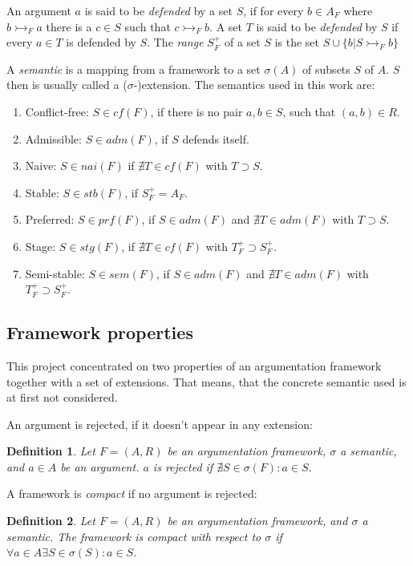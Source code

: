 \documentclass[parskip=half]{scrartcl}
\newtheorem{definition}{Definition}
\begin{document}
An argument $a$ is said to be \emph{defended} by a set $S$, if for every $b \in
A_F$ where $b \rightarrowtail_F a$ there is a $c \in S$ such that $c
\rightarrowtail_F b$. A set $T$ is said to be \emph{defended} by $S$ if every
$a \in T$ is defended by $S$. The \emph{range} $S_F^{+}$ of a set $S$ is the
set $S \cup\{b | S \rightarrowtail_F b\}$

A \emph{semantic} is a mapping from a framework to a set $\sigma(A)$ of subsets
$S$ of $A$.  $S$ then is usually called a ($\sigma$-)extension. The semantics
used in this work are:
\begin{enumerate}
  \item Conflict-free: $S \in cf(F)$, if there is no pair $a,b \in S$, such that
      $(a,b) \in R$.
  \item Admissible: $S \in adm(F)$, if $S$ defends itself.
  \item Naive: $S \in nai(F)$ if $\nexists T\in cf(F)$ with $T \supset S$.
  \item Stable: $S \in stb(F)$, if $S_F^{+} = A_F$.
  \item Preferred: $S \in prf(F)$, if $S \in adm(F)$ and $\nexists T\in adm(F)$
      with $T \supset S$.
  \item Stage: $S \in stg(F)$, if $\nexists T\in cf(F)$ with $T_F^{+} \supset
      S_F^{+}$.
  \item Semi-stable: $S \in sem(F)$, if $S \in adm(F)$ and $\nexists T\in
      adm(F)$ with $T_F^{+} \supset S_F^{+}$.
\end{enumerate}

\subsection{Framework properties} \label{framework_props}
This project concentrated on two properties of an argumentation framework
together with a set of extensions. That means, that the concrete semantic used
is at first not considered.

An argument is rejected, if it doesn't appear in any extension:

\begin{definition}
Let $F=(A,R)$ be an argumentation framework, $\sigma$ a semantic, and $a\in A$
be an argument. $a$ is \emph{rejected} if $\nexists S\in\sigma(F): a\in S$.
\end{definition}

A framework is \emph{compact} if no argument is rejected:

\begin{definition}
Let $F=(A,R)$ be an argumentation framework, and $\sigma$ a semantic.  The
framework is \emph{compact} with respect to $\sigma$ if $\forall a\in A\exists
S\in\sigma(S):a\in S$.
\end{definition}
\end{document}
